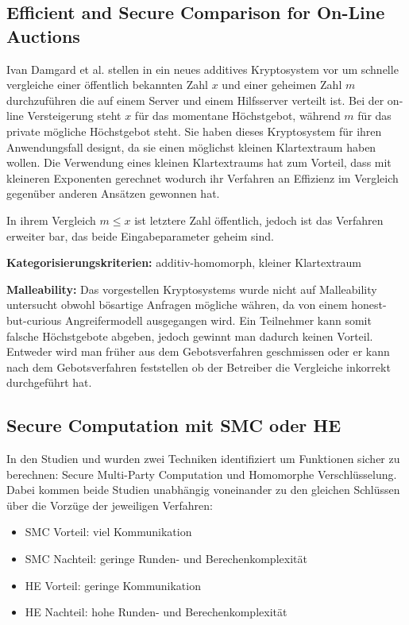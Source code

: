 \documentclass[12pt,a4paper]{scrartcl}	%
\begin{document}
\subsection{Efficient and Secure Comparison for On-Line Auctions}
Ivan Damgard et al. stellen in \cite{damgaard2007efficient} ein neues additives Kryptosystem vor um schnelle vergleiche einer öffentlich bekannten Zahl $x$ und einer geheimen Zahl $m$ durchzuführen die auf einem Server und einem Hilfsserver verteilt ist. Bei der on-line Versteigerung steht $x$ für das momentane Höchstgebot, während $m$ für das private mögliche Höchstgebot steht. Sie haben dieses Kryptosystem für ihren Anwendungsfall designt, da sie einen möglichst kleinen Klartextraum haben wollen. Die Verwendung eines kleinen Klartextraums hat zum Vorteil, dass mit kleineren Exponenten gerechnet wodurch ihr Verfahren an Effizienz im Vergleich gegenüber anderen Ansätzen gewonnen hat. 

In ihrem Vergleich $m\leq x$ ist letztere Zahl öffentlich, jedoch ist das Verfahren erweiter bar, das beide Eingabeparameter geheim sind. 

\textbf{Kategorisierungskriterien:} additiv-homomorph, kleiner Klartextraum

\textbf{Malleability:} Das vorgestellen Kryptosystems wurde nicht auf Malleability untersucht obwohl bösartige Anfragen mögliche währen, da von einem honest-but-curious Angreifermodell ausgegangen wird. Ein Teilnehmer kann somit falsche Höchstgebote abgeben, jedoch gewinnt man dadurch keinen Vorteil. Entweder wird man früher aus dem Gebotsverfahren geschmissen oder er kann nach dem Gebotsverfahren feststellen ob der Betreiber die Vergleiche inkorrekt durchgeführt hat.  

\subsection{Secure Computation mit SMC oder HE}
In den Studien \cite[p.420]{damgaard2007efficient} und \cite[p.2]{sadeghi2009efficient} wurden zwei Techniken identifiziert um Funktionen sicher zu berechnen: Secure Multi-Party Computation und Homomorphe Verschlüsselung. Dabei kommen beide Studien unabhängig voneinander zu den gleichen Schlüssen über die Vorzüge der jeweiligen Verfahren:
\begin{itemize}
\item SMC Vorteil: viel Kommunikation
\item SMC Nachteil: geringe Runden- und Berechenkomplexität
\item HE Vorteil: geringe Kommunikation
\item HE Nachteil: hohe Runden- und Berechenkomplexität


\end{itemize}
\end{document}
